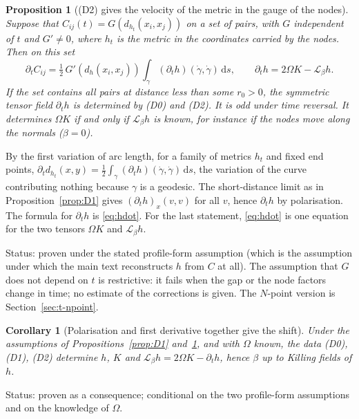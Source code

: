 \documentclass[11pt,a4paper]{article}
\makeatletter
\theoremstyle{stmt}
\newtheorem{proposition}[theorem]{Proposition}
\newtheorem{corollary}[theorem]{Corollary}
\theoremstyle{defn}
\theoremstyle{rmk}
\renewenvironment{proof}[1][\proofname]{\par\pushQED{\qed}\normalfont\topsep6\p@\@plus6\p@\relax
  \trivlist\item[\hskip\labelsep{\sffamily\itshape\small #1.}]\ignorespaces}{\popQED\endtrivlist\@endpefalse}
\numberwithin{equation}{section}
\newcommand{\Lie}{\mathcal{L}}
\newcommand{\status}[1]{\par\noindent\textsf{\small Status: #1}\par}
\newcommand{\dd}{\mathrm{d}}
\makeatother
\begin{document}
{\begin{proposition}[\textup{(D2)} gives the velocity of the metric in the gauge of the nodes]\label{prop:D2}
Suppose that $C_{ij}(t)=G(d_{h_t}(x_i,x_j))$ on a set of pairs, with $G$ independent of $t$ and $G'\ne0$, where $h_t$ is the metric in the coordinates carried by the nodes. Then on this set
\begin{equation}\label{eq:Cdot}
\partial_tC_{ij}=\tfrac12\,G'(d_h(x_i,x_j))\int_\gamma(\partial_th)(\dot\gamma,\dot\gamma)\,\dd s,\qquad\partial_th=2\Omega K-\Lie_\beta h .
\end{equation}
If the set contains all pairs at distance less than some $r_0>0$, the symmetric tensor field $\partial_th$ is determined by \textup{(D0)} and \textup{(D2)}. It is odd under time reversal. It determines $\Omega K$ if and only if $\Lie_\beta h$ is known, for instance if the nodes move along the normals ($\beta=0$).
\end{proposition}

\begin{proof}
By the first variation of arc length, for a family of metrics $h_t$ and fixed end points, $\partial_td_{h_t}(x,y)=\tfrac12\int_\gamma(\partial_th)(\dot\gamma,\dot\gamma)\,\dd s$, the variation of the curve contributing nothing because $\gamma$ is a geodesic. The short-distance limit as in Proposition~\ref{prop:D1} gives $(\partial_th)_x(v,v)$ for all $v$, hence $\partial_th$ by polarisation. The formula for $\partial_th$ is \eqref{eq:hdot}. For the last statement, \eqref{eq:hdot} is one equation for the two tensors $\Omega K$ and $\Lie_\beta h$.
\end{proof}
\status{proven under the stated profile-form assumption (which is the assumption under which the main text reconstructs $h$ from $C$ at all). The assumption that $G$ does not depend on $t$ is restrictive: it fails when the gap or the node factors change in time; no estimate of the corrections is given. The $N$-point version is Section~\ref{sec:t-npoint}.}

\begin{corollary}[Polarisation and first derivative together give the shift]\label{cor:shift}
Under the assumptions of Propositions~\ref{prop:D1} and~\ref{prop:D2}, and with $\Omega$ known, the data \textup{(D0)}, \textup{(D1)}, \textup{(D2)} determine $h$, $K$ and $\Lie_\beta h=2\Omega K-\partial_th$, hence $\beta$ up to Killing fields of $h$.
\end{corollary}
\status{proven as a consequence; conditional on the two profile-form assumptions and on the knowledge of $\Omega$.}

}
\end{document}
